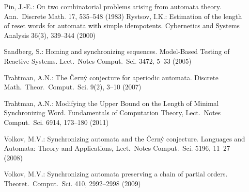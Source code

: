 \documentclass[11pt]{llncs}
\begin{document}
\begin{thebibliography}{99}
Pin, J.-E.: On two combinatorial problems arising from automata
theory. Ann.\ Discrete Math. 17, 535--548 (1983)
%
Rystsov, I.K.: Estimation of the length of reset words for automata with simple idempotents.
Cybernetics and Systems Analysis 36(3), 339--344 (2000)


Sandberg, S.: Homing and synchronizing sequences.
Model-Based Testing of Reactive Systems. Lect.\ Notes Comput.\ Sci. 3472, 5--33 (2005)
%
%
%

Trahtman, A.N.: The \v{C}ern\'y conjecture for aperiodic automata.
Discrete Math.\ Theor.\ Comput.\ Sci. 9(2), 3--10 (2007)

Trahtman, A.N.: Modifying the Upper Bound on the Length of Minimal Synchronizing Word.
Fundamentals of Computation Theory, Lect.\ Notes Comput.\ Sci. 6914, 173--180 (2011)

%

Volkov, M.V.: Synchronizing automata and the \v{C}ern\'{y}
conjecture.
Languages and Automata: Theory and Applications, Lect.\ Notes
Comput.\ Sci. 5196, 11--27 (2008)

Volkov, M.V.: Synchronizing automata preserving a chain of partial
orders. Theoret.\ Comput.\ Sci. 410, 2992--2998 (2009)
\end{thebibliography}
\end{document}
